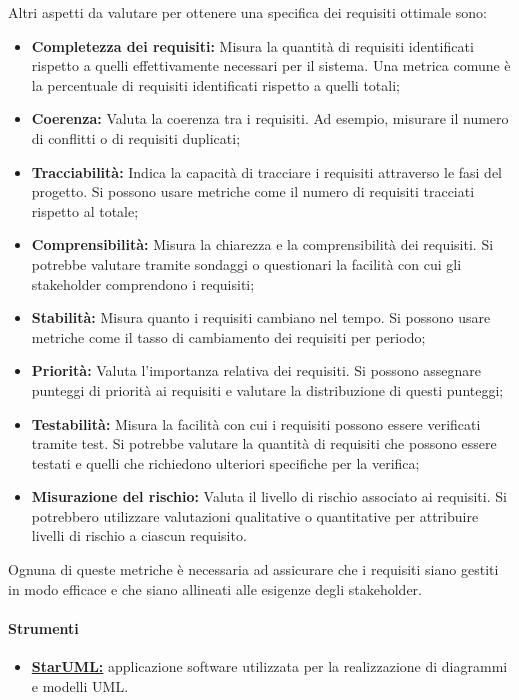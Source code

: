 Altri aspetti da valutare per ottenere una specifica dei requisiti ottimale sono: 
\begin{itemize}
    \item \textbf{Completezza dei requisiti:} Misura la quantità di requisiti identificati rispetto a quelli effettivamente necessari per il sistema. Una metrica comune è la percentuale di requisiti identificati rispetto a quelli totali;
    \item \textbf{Coerenza:} Valuta la coerenza tra i requisiti. Ad esempio, misurare il numero di conflitti o di requisiti duplicati;
    \item \textbf{Tracciabilità:} Indica la capacità di tracciare i requisiti attraverso le fasi del progetto. Si possono usare metriche come il numero di requisiti tracciati rispetto al totale;
    \item \textbf{Comprensibilità:} Misura la chiarezza e la comprensibilità dei requisiti. Si potrebbe valutare tramite sondaggi o questionari la facilità con cui gli stakeholder comprendono i requisiti;
    \item \textbf{Stabilità:} Misura quanto i requisiti cambiano nel tempo. Si possono usare metriche come il tasso di cambiamento dei requisiti per periodo;
    \item \textbf{Priorità:} Valuta l'importanza relativa dei requisiti. Si possono assegnare punteggi di priorità ai requisiti e valutare la distribuzione di questi punteggi;
    \item \textbf{Testabilità:} Misura la facilità con cui i requisiti possono essere verificati tramite test. Si potrebbe valutare la quantità di requisiti che possono essere testati e quelli che richiedono ulteriori specifiche per la verifica;
    \item \textbf{Misurazione del rischio:} Valuta il livello di rischio associato ai requisiti. Si potrebbero utilizzare valutazioni qualitative o quantitative per attribuire livelli di rischio a ciascun requisito.
\end{itemize}
Ognuna di queste metriche è necessaria ad assicurare che i requisiti siano gestiti in modo efficace e che siano allineati alle esigenze degli stakeholder.

\paragraph{Strumenti}
\begin{itemize}
    \item \href{https://staruml.io/}{\textbf{StarUML:}} applicazione software utilizzata per la realizzazione di diagrammi e modelli UML.
\end{itemize}

